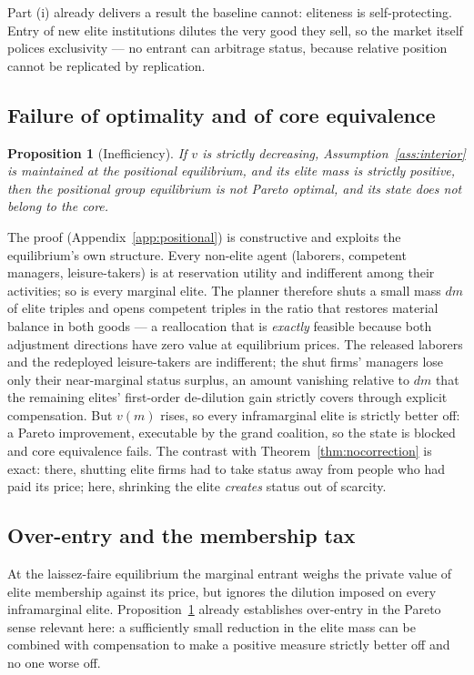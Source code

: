 \documentclass[12pt,letterpaper]{article}
\newtheorem{proposition}{Proposition}
\theoremstyle{definition}
\begin{document}
Part (i) already delivers a result the baseline cannot: eliteness is self-protecting.
Entry of new elite institutions dilutes the very good they sell, so the market itself polices exclusivity --- no entrant can arbitrage status, because relative position cannot be replicated by replication.

\subsection{Failure of optimality and of core equivalence}

\begin{proposition}[Inefficiency]\label{prop:inefficiency} If $v$ is strictly decreasing, Assumption~\ref{ass:interior} is maintained at the positional equilibrium, and its elite mass is strictly positive, then the positional group equilibrium is not Pareto optimal, and its state does not belong to the core.
\end{proposition}

The proof (Appendix~\ref{app:positional}) is constructive and exploits the equilibrium's own structure.
Every non-elite agent (laborers, competent managers, leisure-takers) is at reservation utility and indifferent among their activities; so is every marginal elite.
The planner therefore shuts a small mass $dm$ of elite triples and opens competent triples in the ratio that restores material balance in both goods --- a reallocation that is \emph{exactly} feasible because both adjustment directions have zero value at equilibrium prices.
The released laborers and the redeployed leisure-takers are indifferent; the shut firms' managers lose only their near-marginal status surplus, an amount vanishing relative to $dm$ that the remaining elites' first-order de-dilution gain strictly covers through explicit compensation.
But $v(m)$ rises, so every inframarginal elite is strictly better off: a Pareto improvement, executable by the grand coalition, so the state is blocked and core equivalence fails.
The contrast with Theorem~\ref{thm:nocorrection} is exact: there, shutting elite firms had to take status away from people who had paid its price; here, shrinking the elite \emph{creates} status out of scarcity.

\subsection{Over-entry and the membership tax}

At the laissez-faire equilibrium the marginal entrant weighs the private value of elite membership against its price, but ignores the dilution imposed on every inframarginal elite.
Proposition~\ref{prop:inefficiency} already establishes over-entry in the Pareto sense relevant here: a sufficiently small reduction in the elite mass can be combined with compensation to make a positive measure strictly better off and no one worse off.
\end{document}
